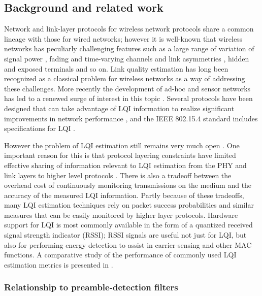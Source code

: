 \documentclass[journal]{IEEEtran}
\begin{document}
\subsection{Background and related work}

Network and link-layer protocols for wireless network protocols share a common
lineage with those for wired networks; however it is well-known that wireless
networks has peculiarly challenging features such as a large range of variation
of signal power \cite{dynrange}, fading and time-varying channels
\cite{timevarying} and link asymmetries \cite{asymmetries}, hidden and exposed
terminals \cite{hidden_term} and so on. Link quality estimation has long been
recognized as a classical problem for wireless networks \cite{lqi_1990} as a
way of addressing these challenges. More recently the development of ad-hoc and
sensor networks has led to a renewed surge of interest in this topic
\cite{couto2005high}. Several protocols have been designed that can take
advantage of LQI information to realize significant improvements in network
performance \cite{prot1, prot2, prot3}, and the IEEE 802.15.4 standard includes
specifications for LQI \cite{zigbee_lqi}.

However the problem of LQI estimation still remains very much open
\cite{indoor_lqi_survey, lqi_multihop}. One important reason for this is that
protocol layering constraints have limited effective sharing of information
relevant to LQI estimation from the PHY and link layers to higher level
protocols \cite{fourbit_lqi}. There is also a tradeoff between the overhead
cost of continuously monitoring transmissions on the medium and the accuracy of
the measured LQI information. Partly because of these tradeoffs, many LQI
estimation techniques \cite{lqi_wsn} rely on packet success probabilities and
similar measures that can be easily monitored by higher layer protocols.
Hardware support for LQI is most commonly available in the form of a quantized
received signal strength indicator (RSSI); RSSI signals are useful not just for
LQI, but also for performing energy detection to assist in carrier-sensing
\cite{cca} and other MAC functions. A comparative study of the performance of
commonly used LQI estimation metrics is presented in \cite{lqi_survey1}.

\subsubsection{Relationship to preamble-detection filters}
\end{document}
